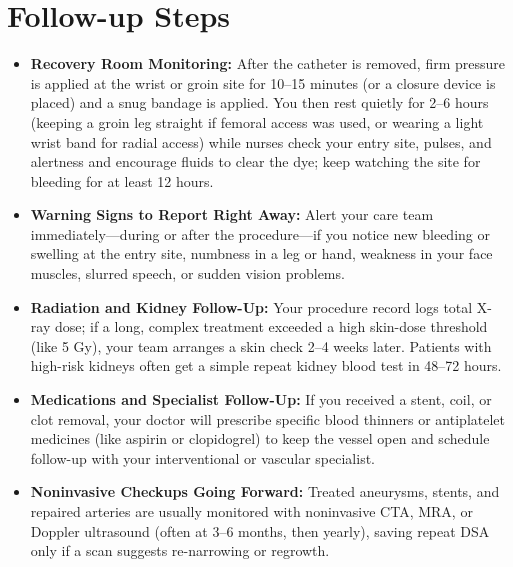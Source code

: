 \section{Follow-up Steps}
\begin{itemize}
\item \textbf{Recovery Room Monitoring:} After the catheter is removed, firm pressure is applied at the wrist or groin site for 10--15 minutes (or a closure device is placed) and a snug bandage is applied. You then rest quietly for 2--6 hours (keeping a groin leg straight if femoral access was used, or wearing a light wrist band for radial access) while nurses check your entry site, pulses, and alertness and encourage fluids to clear the dye; keep watching the site for bleeding for at least 12 hours.
\item \textbf{Warning Signs to Report Right Away:} Alert your care team immediately---during or after the procedure---if you notice new bleeding or swelling at the entry site, numbness in a leg or hand, weakness in your face muscles, slurred speech, or sudden vision problems.
\item \textbf{Radiation and Kidney Follow-Up:} Your procedure record logs total X-ray dose; if a long, complex treatment exceeded a high skin-dose threshold (like 5 Gy), your team arranges a skin check 2--4 weeks later. Patients with high-risk kidneys often get a simple repeat kidney blood test in 48--72 hours.
\item \textbf{Medications and Specialist Follow-Up:} If you received a stent, coil, or clot removal, your doctor will prescribe specific blood thinners or antiplatelet medicines (like aspirin or clopidogrel) to keep the vessel open and schedule follow-up with your interventional or vascular specialist.
\item \textbf{Noninvasive Checkups Going Forward:} Treated aneurysms, stents, and repaired arteries are usually monitored with noninvasive CTA, MRA, or Doppler ultrasound (often at 3--6 months, then yearly), saving repeat DSA only if a scan suggests re-narrowing or regrowth.
\end{itemize}

